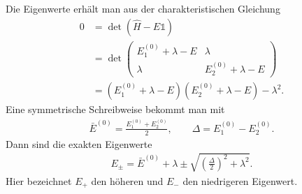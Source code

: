 \documentclass[11pt,a4paper]{scrartcl}
\newcommand{\op}[1]{\hat{#1}}
\begin{document}
\begin{enumerate}[label=(\alph*)]
\begin{calculationbox}
            \begin{calculationbox}[title=Exakte Eigenwerte]
                Die Eigenwerte erhält man aus der charakteristischen Gleichung
                \begin{align*}
                    0
                    &=
                    \det(\op H-E\mathbb{1}) \\
                    &=
                    \det
                    \begin{pmatrix}
                        E_1^{(0)}+\lambda-E & \lambda\\
                        \lambda & E_2^{(0)}+\lambda-E
                    \end{pmatrix} \\
                    &=
                    (E_1^{(0)}+\lambda-E)(E_2^{(0)}+\lambda-E)-\lambda^2.
                \end{align*}
                Eine symmetrische Schreibweise bekommt man mit
                \begin{align*}
                    \bar E^{(0)}
                    =
                    \frac{E_1^{(0)}+E_2^{(0)}}{2},
                    \qquad
                    \Delta
                    =
                    E_1^{(0)}-E_2^{(0)}.
                \end{align*}
                Dann sind die exakten Eigenwerte
                \begin{align*}
                    \boxed{
                    E_{\pm}
                    =
                    \bar E^{(0)}+\lambda
                    \pm
                    \sqrt{\left(\frac{\Delta}{2}\right)^2+\lambda^2}}
                    .
                \end{align*}
                Hier bezeichnet $E_+$ den höheren und $E_-$ den niedrigeren Eigenwert.
            \end{calculationbox}


\end{calculationbox}
\end{enumerate}
\end{document}
